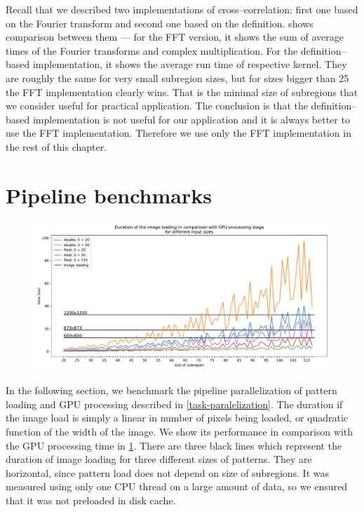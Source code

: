 Recall that we described two implementations of cross--correlation: first one based on the Fourier transform and second one based on the definition.  shows comparison between them --- for the FFT version, it shows the sum of average times of the Fourier transforms and complex multiplication. For the definition--based implementation, it shows the average run time of respective kernel. They are roughly the same for very small subregion sizes, but for sizes bigger than 25 the FFT implementation clearly wins. That is the minimal size of subregions that we consider useful for practical application. The conclusion is that the definition--based implementation is not useful for our application and it is always better to use the FFT implementation. Therefore we use only the FFT implementation in the rest of this chapter.





\section{Pipeline benchmarks}
\label{load-eval}

\begin{figure}
	\centering
	\includegraphics[width=\textwidth]{img/eval/load-plot}
	\caption{}
	\label{load-plot}
\end{figure}

In the following section, we benchmark the pipeline parallelization of pattern loading and GPU processing described in \cref{task-paralelization}. The duration if the image load is simply a linear in number of pixels being loaded, or quadratic function of the width of the image. We show its performance in comparison with the GPU processing time in \cref{load-plot}. There are three black lines which represent the duration of image loading for three different sizes of patterns. They are horizontal, since pattern load does not depend on size of subregions. It was measured using only one CPU thread on a large amount of data, so we ensured that it was not preloaded in disk cache.

